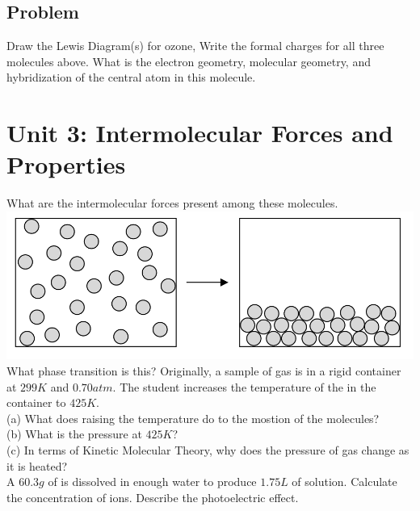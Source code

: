 \documentclass{article}
\begin{document}
\subsection*{Problem \countThis}
Draw the Lewis Diagram(s) for ozone, 
\ProblemSet
Write the formal charges for all three molecules above.
\ProblemSet
What is the electron geometry, molecular geometry, and hybridization of the central atom in this molecule. \\ 
\section{Unit 3: Intermolecular Forces and Properties}
\ProblemSet
What are the intermolecular forces present among these molecules. \\ 
\ProblemSet
\includegraphics[scale = 0.5]{photo3.png} \\
What phase transition is this?
\ProblemSet
Originally, a sample of gas is in a rigid container at \(299K\) and \(0.70 atm\). The student increases the temperature of the  in the container to \(425K\).\\
(a) What does raising the temperature do to the mostion of the molecules?\\
(b) What is the pressure at \(425K\)?\\
(c) In terms of Kinetic Molecular Theory, why does the pressure of gas change as it is heated? \\
\ProblemSet
A \(60.3g\) of  is dissolved in enough water to produce \(1.75L\) of solution. Calculate the concentration of  ions. 
\ProblemSet
Describe the photoelectric effect. 
\end{document}

